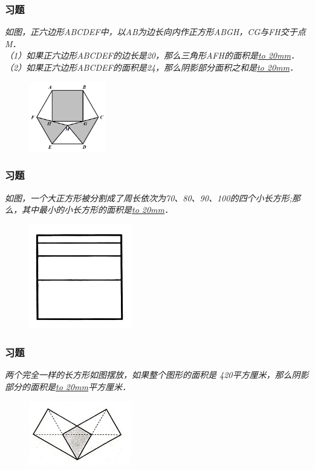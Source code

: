 \begin{frame}
    \frametitle{习题\theframecounter}
    \textit{如图，正六边形ABCDEF中，以AB为边长向内作正方形ABGH，CG与FH交于点M．\\
    （1）如果正六边形ABCDEF的边长是20，那么三角形AFH的面积是\underline{\hbox to 20mm{}}．\\
    （2）如果正六边形ABCDEF的面积是24，那么阴影部分面积之和是\underline{\hbox to 20mm{}}．} 
    \begin{figure}[H] 
        \centering
        \includegraphics[width=0.3\textwidth]{./pics/Chapter_3/3.png}
    \end{figure}
\end{frame}

\begin{frame}
    \frametitle{习题\theframecounter}
    \textit{如图，一个大正方形被分割成了周长依次为70、80、90、100的四个小长方形;那么，其中最小的小长方形的面积是\underline{\hbox to 20mm{}}．} 
    \begin{figure}[H] 
        \centering
        \includegraphics[width=0.4\textwidth]{./pics/Chapter_3/4.png}
    \end{figure}
\end{frame}

\begin{frame}
    \frametitle{习题\theframecounter}
    \textit{两个完全一样的长方形如图摆放，如果整个图形的面积是 420平方厘米，那么阴影部分的面积是\underline{\hbox to 20mm{}}平方厘米．} 
    \begin{figure}[H] 
        \centering
        \includegraphics[width=0.4\textwidth]{./pics/Chapter_3/5.png}
    \end{figure}
\end{frame}

